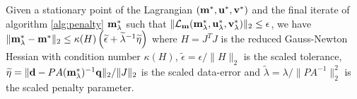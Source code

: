 \documentclass{iopart}
\begin{document}
\begin{theorem}
\label{theorem2}
Given a stationary point of the Lagrangian $(\mathbf{m}^*, \mathbf{u}^*, \mathbf{v}^*)$ and the final iterate of algorithm \ref{alg:penalty} $\mathbf{m}^*_{\lambda}$ such that $\|\mathcal{L}_{\mathbf{m}}(\mathbf{m}^*_{\lambda},\mathbf{u}^*_{\lambda},\mathbf{v}^*_{\lambda})\|_2 \leq \epsilon$, we have $\|\mathbf{m}^*_{\lambda} - \mathbf{m}^*\|_2 \leq \kappa(H)\left( \widetilde{\epsilon} + \widetilde{\lambda}^{-1}\widetilde{\eta}\right)$ where $H = J^T\!J$ is the reduced Gauss-Newton Hessian with condition number $\kappa(H)$, $\widetilde{\epsilon} = \epsilon/\|H\|_2$ is the scaled tolerance, $\widetilde{\eta} = \|\mathbf{d} - PA(\mathbf{m}^*_{\lambda})^{-1}\mathbf{q}\|_2/\|J\|_2$ is the scaled data-error and $\widetilde{\lambda} = \lambda / \|PA^{-1}\|_2^2$ is the scaled penalty parameter.
\end{theorem}
\end{document}
